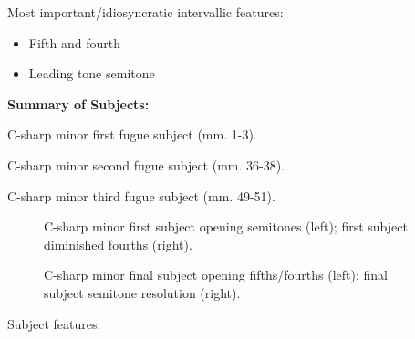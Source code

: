 Most important/idiosyncratic intervallic features:

\begin{itemize}
\tightlist
\item
  Fifth and fourth
\item
  Leading tone semitone
\end{itemize}

\textbf{Summary of Subjects:}



\begin{Example}[H]
\vspace{1.5em}
    \centering
    \caption{ C-sharp minor first fugue subject (mm. 1-3). }
\end{Example}    


\begin{Example}[H]
\vspace{1.5em}
    \centering
    \caption{ C-sharp minor second fugue subject (mm. 36-38). }
\end{Example}    


\begin{Example}[H]
\vspace{1.5em}
    \centering
    \caption{ C-sharp minor third fugue subject (mm. 49-51). }
\end{Example}    


\begin{figure}[H]
\vspace{1.5em}
    \centering
    \caption[C-sharp minor first subject opening semitones; first subject diminished fourths. ]{C-sharp minor first subject opening semitones (left); first subject diminished fourths (right).}
\end{figure}

\begin{figure}[H]
\vspace{1.5em}
    \centering
    \caption[C-sharp minor final subject opening fifths/fourths; final subject semitone resolution. ]{C-sharp minor final subject opening fifths/fourths (left); final subject semitone resolution (right).}
\end{figure}    Subject features:

